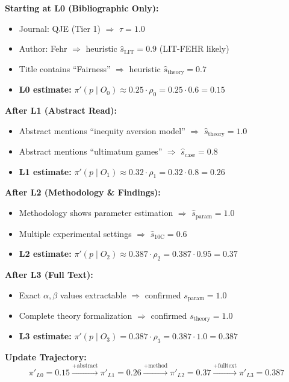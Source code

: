 \begin{tcolorbox}[colback=yellow!5!white, colframe=yellow!75!black,
    title=\textbf{Example: Bayesian Update for Fehr \& Schmidt (1999)}]

\textbf{Starting at L0 (Bibliographic Only):}
\begin{itemize}[nosep]
    \item Journal: QJE (Tier 1) $\Rightarrow$ $\tau = 1.0$
    \item Author: Fehr $\Rightarrow$ heuristic $\hat{s}_{\text{LIT}} = 0.9$ (LIT-FEHR likely)
    \item Title contains ``Fairness'' $\Rightarrow$ heuristic $\hat{s}_{\text{theory}} = 0.7$
    \item \textbf{L0 estimate:} $\pi'(p \mid O_0) \approx 0.25 \cdot \rho_0 = 0.25 \cdot 0.6 = 0.15$
\end{itemize}

\textbf{After L1 (Abstract Read):}
\begin{itemize}[nosep]
    \item Abstract mentions ``inequity aversion model'' $\Rightarrow$ $\hat{s}_{\text{theory}} = 1.0$
    \item Abstract mentions ``ultimatum games'' $\Rightarrow$ $\hat{s}_{\text{case}} = 0.8$
    \item \textbf{L1 estimate:} $\pi'(p \mid O_1) \approx 0.32 \cdot \rho_1 = 0.32 \cdot 0.8 = 0.26$
\end{itemize}

\textbf{After L2 (Methodology \& Findings):}
\begin{itemize}[nosep]
    \item Methodology shows parameter estimation $\Rightarrow$ $\hat{s}_{\text{param}} = 1.0$
    \item Multiple experimental settings $\Rightarrow$ $\hat{s}_{\text{10C}} = 0.6$
    \item \textbf{L2 estimate:} $\pi'(p \mid O_2) \approx 0.387 \cdot \rho_2 = 0.387 \cdot 0.95 = 0.37$
\end{itemize}

\textbf{After L3 (Full Text):}
\begin{itemize}[nosep]
    \item Exact $\alpha, \beta$ values extractable $\Rightarrow$ confirmed $s_{\text{param}} = 1.0$
    \item Complete theory formalization $\Rightarrow$ confirmed $s_{\text{theory}} = 1.0$
    \item \textbf{L3 estimate:} $\pi'(p \mid O_3) = 0.387 \cdot \rho_3 = 0.387 \cdot 1.0 = \mathbf{0.387}$
\end{itemize}

\textbf{Update Trajectory:}
\begin{equation}
\pi'_{L0} = 0.15 \xrightarrow{+\text{abstract}} \pi'_{L1} = 0.26
\xrightarrow{+\text{method}} \pi'_{L2} = 0.37
\xrightarrow{+\text{fulltext}} \pi'_{L3} = 0.387
\end{equation}

\end{tcolorbox}

